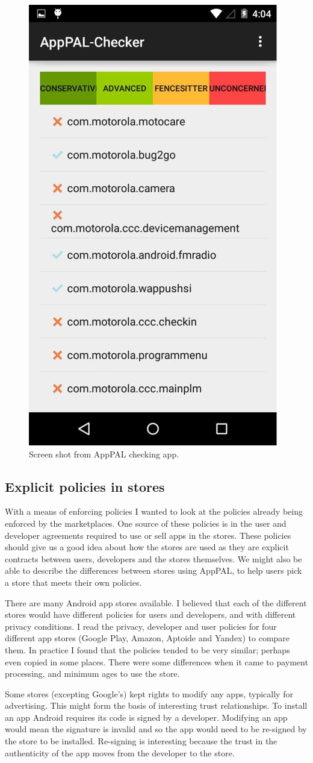 \documentclass[a4paper]{scrartcl}
\begin{document}
\begin{figure}[]
  \centering
  \includegraphics[width=0.3\linewidth]{images/apppal-checker.png}
  \caption{Screen shot from AppPAL checking app.}
  \label{fig:checker}
\end{figure}

\subsection{Explicit policies in stores}

With a means of enforcing policies I wanted to look at the policies already being enforced by the marketplaces.
One source of these policies is in the user and developer agreements required to use or sell apps in the stores.
These policies should give us a good idea about how the stores are used as they are explicit contracts between users, developers and the stores themselves.
We might also be able to describe the differences between stores using AppPAL, to help users pick a store that meets their own policies.

There are many Android app stores available.
I believed that each of the different stores would have different policies for users and developers, and with different privacy conditions.
I read the privacy, developer and user policies for four different app stores (Google Play, Amazon, Aptoide and Yandex) to compare them.
In practice I found that the policies tended to be very similar; perhaps even copied in some places.
There were some differences when it came to payment processing, and minimum ages to use the store.

Some stores (excepting Google's) kept rights to modify any apps, typically for advertising.
This might form the basis of interesting trust relationships.
To install an app Android requires its code is signed by a developer.
Modifying an app would mean the signature is invalid and so the app would need to be re-signed by the store to be installed.
Re-signing is interesting because the trust in the authenticity of the app moves from the developer to the store.
\end{document}
